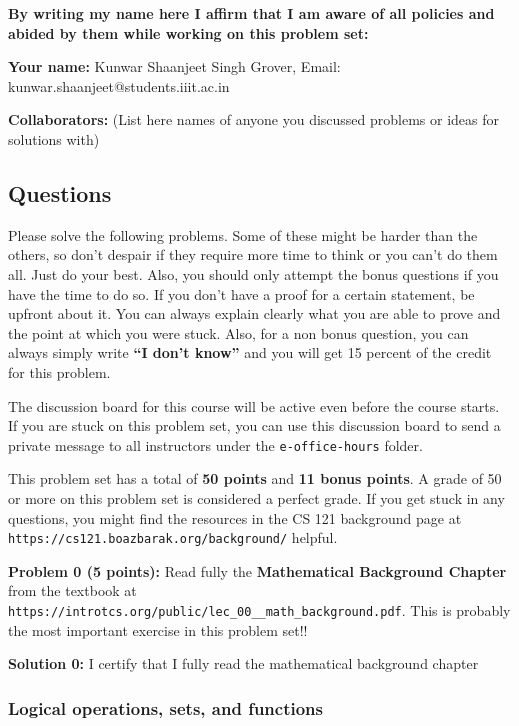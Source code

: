 \documentclass[11pt]{article}
\begin{document}
\textbf{By writing my name here I affirm that I am aware of all policies
and abided by them while working on this problem set:}

\textbf{Your name:} Kunwar Shaanjeet Singh Grover, Email: kunwar.shaanjeet@students.iiit.ac.in

\textbf{Collaborators:} (List here names of anyone you discussed
problems or ideas for solutions with)


\newpage


\subsection*{Questions}\label{questions}

Please solve the following problems. Some of these might be harder than
the others, so don't despair if they require more time to think or you
can't do them all. Just do your best. Also, you should only attempt the
bonus questions if you have the time to do so. If you don't have a proof
for a certain statement, be upfront about it. You can always explain
clearly what you are able to prove and the point at which you were
stuck. Also, for a non bonus question, you can always simply write
\textbf{``I don't know''} and you will get 15 percent of the credit for
this problem.

The discussion board for this course will be active even before the course
starts. If you are stuck on this problem set, you can use this discussion board to send
a private message to all instructors under the \texttt{e-office-hours}
folder.

This problem set has a total of \textbf{50 points} and \textbf{11 bonus
points}. A grade of 50 or more on this problem set is considered a
perfect grade. If you get stuck in any questions, you might find the
resources in the CS 121 background page at {\tt https://cs121.boazbarak.org/background/} helpful.

\textbf{Problem 0 (5 points):} Read fully the \textbf{Mathematical
Background Chapter} from the textbook at 
{\tt https://introtcs.org/public/lec\_00\_\_math\_background.pdf}.
This is probably the most important exercise in this problem set!!

\textbf{Solution 0:} I certify that I fully read the
mathematical background chapter


\subsubsection{Logical operations, sets, and
functions}\label{logical-operations-sets-and-functions}
\end{document}
